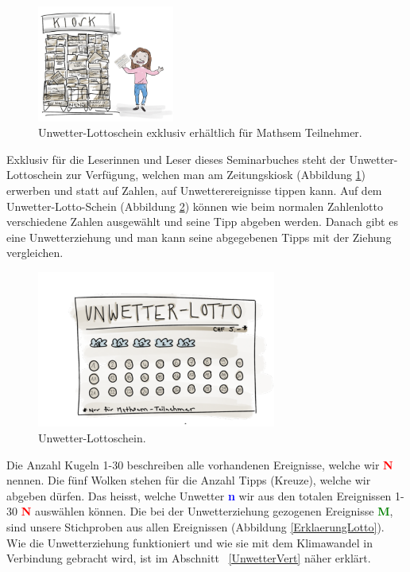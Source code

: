 \begin{refsection}
\begin{figure}
\centering
\includegraphics[width=0.4\textwidth]{extrem/Kiosk.pdf}
\caption{Unwetter-Lottoschein exklusiv erhältlich für Mathsem Teilnehmer.}
\label{Kiosk}
\end{figure}

Exklusiv für die Leserinnen und Leser dieses Seminarbuches steht der Unwetter-Lottoschein zur Verfügung, welchen man am Zeitungskiosk (Abbildung \ref{Kiosk}) erwerben und statt auf Zahlen, auf Unwetterereignisse tippen kann. Auf dem Unwetter-Lotto-Schein (Abbildung \ref{Lottoschein}) können wie beim normalen Zahlenlotto verschiedene Zahlen ausgewählt und seine Tipp abgeben werden. Danach gibt es eine Unwetterziehung und man kann seine abgegebenen Tipps mit der Ziehung vergleichen.

\begin{figure}
\centering
\includegraphics[width=0.7\textwidth]{extrem/Lottoschein.pdf}
\caption{Unwetter-Lottoschein.}
\label{Lottoschein}
\end{figure}

Die Anzahl Kugeln 1-30 beschreiben alle vorhandenen Ereignisse, welche wir \textcolor{red}{\textbf{N}} nennen. Die fünf Wolken stehen für die Anzahl Tipps (Kreuze), welche wir abgeben dürfen. Das heisst, welche Unwetter \textcolor{blue}{\textbf{n}} wir aus den totalen Ereignissen 1-30 \textcolor{red}{\textbf{N}} auswählen können. Die bei der Unwetterziehung gezogenen Ereignisse \textcolor{green}{\textbf{M}}, sind unsere Stichproben aus allen Ereignissen (Abbildung \ref{ErklaerungLotto}). Wie die Unwetterziehung funktioniert und wie sie mit dem Klimawandel in Verbindung gebracht wird, ist im Abschnitt ~\ref{UnwetterVert} näher erklärt.


\end{refsection}
